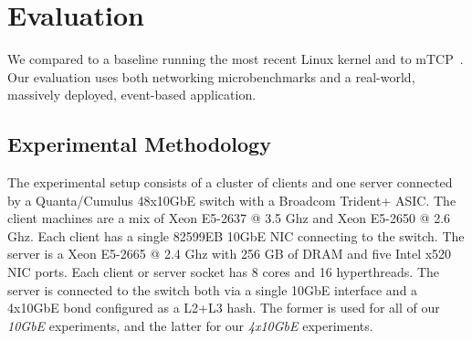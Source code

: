
\section{Evaluation}
\label{sec:eval}


We compared \ix to a baseline running the most recent Linux kernel and to
mTCP~\cite{jeong2014mtcp}. Our evaluation uses both networking
microbenchmarks and a real-world, massively deployed, event-based
application.

\subsection{Experimental Methodology}
\label{sec:eval:setup}



 





The experimental setup consists of a cluster of  clients
and one server connected by  
a Quanta/Cumulus 48x10GbE switch with a Broadcom Trident+ ASIC.
The client machines are a mix of Xeon E5-2637 @ 3.5 Ghz and Xeon
E5-2650 @ 2.6 Ghz.  Each client has a single 82599EB 10GbE NIC
connecting to the switch.  The server is a Xeon E5-2665 @ 2.4 Ghz with
256 GB of DRAM and five Intel x520 NIC ports.  Each client or server
socket has 8 cores and 16 hyperthreads.  The server is connected
to the switch both via a single 10GbE interface and a 4x10GbE bond configured as a L2+L3 hash.  The former is used for all of our \emph{10GbE} experiments, and the latter for our \emph{4x10GbE} experiments. 

